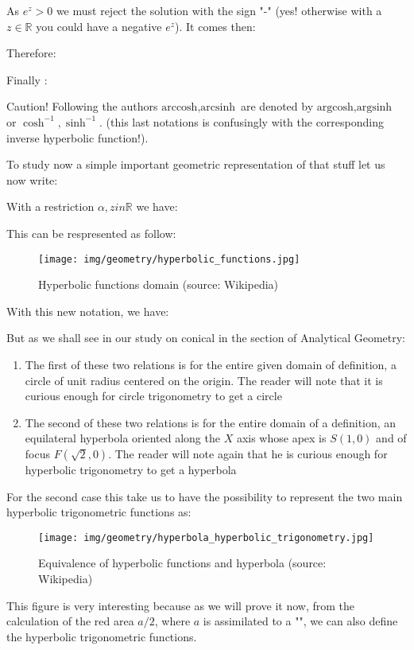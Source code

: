 	As $e^{z}>0$ we must reject the solution with the sign "-" (yes! otherwise with a $z \in \mathbb{R}$ you could have a negative $e^z$). It comes then:
	
	Therefore:
	
	Finally \label{inverse hyperbolic to logarithm}:
	
	Caution! Following the authors $\text{arccosh}, \text{arcsinh}$ are denoted by $\text{argcosh}, \text{argsinh}$ or $\cosh^{-1}, \sinh^{-1}$. (this last notations is confusingly with the corresponding inverse hyperbolic function!).
	
	To study now a simple important geometric representation of that stuff let us now write:
	
	With a restriction $\alpha,z in \mathbb{R}$ we have:
	
	This can be respresented as follow:
	\begin{figure}[H]
	\centering
	\texttt{[image: img/geometry/hyperbolic\_functions.jpg]}
	\caption[Hyperbolic functions domain]{Hyperbolic functions domain (source: Wikipedia)}
	\end{figure}
	With this new notation, we have:
	
	But as we shall see in our study on conical in the section of Analytical Geometry:
	\begin{enumerate}
		\item The first of these two relations is for the entire given domain of definition, a circle of unit radius centered on the origin. The reader will note that it is curious enough for circle trigonometry to get a circle \Winkey
		\item The second of these two relations is for the entire domain of a definition, an equilateral hyperbola oriented along the $X$ axis whose apex is $S (1,0)$ and of focus $F(\sqrt{2},0)$. The reader will note again that he is curious enough for hyperbolic trigonometry to get a hyperbola \Winkey
	\end{enumerate}
	For the second case this take us to have the possibility to represent the two main hyperbolic trigonometric functions as:
	\begin{figure}[H]
	\centering
	\texttt{[image: img/geometry/hyperbola\_hyperbolic\_trigonometry.jpg]}
	\caption[Equivalence of hyperbolic functions and hyperbola]{Equivalence of hyperbolic functions and hyperbola (source: Wikipedia)}
	\end{figure}
	This figure is very interesting because as we will prove it now, from the calculation of the red area $a/2$, where $a$ is assimilated to a "", we can also define the hyperbolic trigonometric functions.
	

